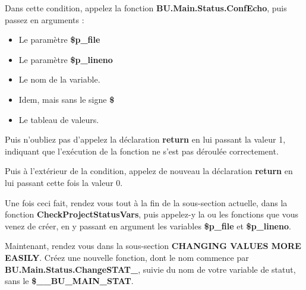 \documentclass[a4paper,10pt]{article}
\begin{document}
\begin{justify}
    Dans cette condition, appelez la fonction \textbf{\color{mauve}BU.Main.Status.ConfEcho}, puis passez en arguments :

    \begin{itemize}
        \item Le paramètre \textbf{\color{vars}\$p\_file}\\\mbox{}

        \item Le paramètre \textbf{\color{vars}\$p\_lineno}\\\mbox{}

        \item Le nom de la variable.\\\mbox{}

        \item Idem, mais sans le signe \textbf{\$}\\\mbox{}

        \item Le tableau de valeurs.
    \end{itemize}
\end{justify}

\begin{justify}
    Puis n'oubliez pas d'appelez la déclaration \textbf{\color{cmds}return} en lui passant la valeur 1, indiquant que l'exécution de la fonction ne s'est pas déroulée correctement.
\end{justify}

\begin{justify}
    Puis à l'extérieur de la condition, appelez de nouveau la déclaration \textbf{\color{cmds}return} en lui passant cette fois la valeur 0.
\end{justify}

\begin{justify}
    Une fois ceci fait, rendez vous tout à la fin de la sous-section actuelle, dans la fonction \textbf{\color{mauve}CheckProjectStatusVars}, puis appelez-y la ou les fonctions que vous venez de créer, en y passant en argument les variables \textbf{\color{vars}\$p\_file} et \textbf{\color{vars}\$p\_lineno}.\\\mbox{}
\end{justify}


\begin{justify}
    Maintenant, rendez vous dans la sous-section \textbf{CHANGING VALUES MORE EASILY}. Créez une nouvelle fonction, dont le nom commence par \textbf{\color{mauve}BU.Main.Status.ChangeSTAT\_}, suivie du nom de votre variable de statut, sans le \textbf{\color{vars}\$\_\_BU\_MAIN\_STAT}.
\end{justify}
\end{document}
